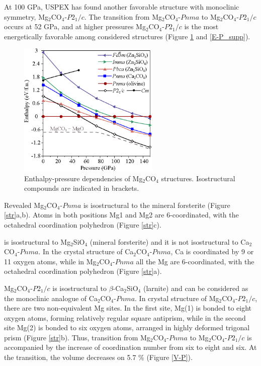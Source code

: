 \documentclass[a4paperm]{article}
\begin{document}
At 100 GPa, USPEX has found another favorable structure with monoclinic symmetry, Mg$_2$CO$_4$-$P2_1/c$.
The transition from Mg$_2$CO$_4$-$Pnma$ to Mg$_2$CO$_4$-$P2_1/c$ occurs at 52 GPa, and at higher pressures Mg$_2$CO$_4$-$P2_1/c$ is the most energetically favorable among considered structures (Figure \ref{E-P} and \ref{E-P_supp}). 

\begin{figure}[H]
	\includegraphics[width=0.6\textwidth]{E-P_mg2co4} \centering
	\caption{Enthalpy-pressure dependencies of Mg$_2$CO$_4$ structures. Isostructural compounds are indicated in brackets.} \label{E-P}
\end{figure}


Revealed Mg$_2$CO$_4$-$Pnma$ is isostructural to the mineral forsterite (Figure \ref{str}a,b).
Atoms in both positions Mg1 and Mg2 are 6-coordinated, with the octahedral coordination polyhedron (Figure \ref{str}c).

is isostructural to Mg$_2$SiO$_4$ (mineral forsterite) and it is not isostructural to Ca$_2$CO$_4$-$Pnma$. 
In the crystal structure of Ca$_2$CO$_4$-$Pnma$, Ca is coordinated by 9 or 11 oxygen atoms, while in Mg$_2$CO$_4$-$Pnma$ all the Mg are 6-coordinated, with the octahedral coordination polyhedron (Figure \ref{str}a).


Mg$_2$CO$_4$-$P2_1/c$ is isostructural to $\beta$-Ca$_2$SiO$_4$ (larnite) and can be considered as the monoclinic analogue of Ca$_2$CO$_4$-$Pnma$.
In crystal structure of Mg$_2$CO$_4$-$P2_1/c$, there are two non-equivalent Mg sites. 
In the first site, Mg(1) is bonded to eight oxygen atoms, forming relatively regular square antiprism, while in the second site Mg(2) is bonded to six oxygen atoms, arranged in highly deformed trigonal prism  (Figure \ref{str}b).
Thus, transition from Mg$_2$CO$_4$-$Pnma$ to Mg$_2$CO$_4$-$P2_1/c$ is accompanied by the increase of coordination number from six to eight and six.
At the transition, the volume  decreases on 5.7 \% (Figure \ref{V-P}).
\end{document}
